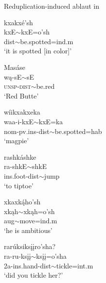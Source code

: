 \begin{exe}
\item\label{ablautredup} Reduplication-induced ablaut in \citet{hollow1970}

	\begin{xlist}

	\item\label{ablautredup1}
	\glll kxakxé'sh\\
	kxE$\sim$kxE=o'sh\\
	dist$\sim$\textnormal{be.spotted}=ind.m\\
	\glt `it is spotted [in color]' \citep[126]{hollow1970}

	\item\label{ablautredup2}
	\glll Masáse\\
	wą-sE$\sim$sE\\
	\textsc{unsp}-\textsc{dist}$\sim$\textnormal{be.red}\\
	\glt `Red Butte' \citep[29]{hollow1970}

	\item\label{ablautredup3}
	\glll wíikxakxeka\\
	waa-i-kxE$\sim$kxE=ka\\
	nom-pv.ins-dist$\sim$\textnormal{be.spotted}=hab\\
	\glt `magpie' \citep[289]{hollow1970}

	\item\label{ablautredup4}
	\glll rashkáshke\\
	ra-shkE$\sim$shkE\\
	ins.foot-dist$\sim$\textnormal{jump}\\
	\glt `to tiptoe' \citep[231]{hollow1970}

	\item\label{ablautredup5}
	\glll xkaxką́ho'sh\\
	xkąh$\sim$xkąh=o'sh\\
	aug$\sim$\textnormal{move}=ind.m\\
	\glt `he is ambitious' \citep[316]{hollow1970}

	\item\label{ablautredup6}
	\glll rarúksiksįįro'sha?\\
	ra-ru-ksįį$\sim$ksįį=o'sha\\
	2a-ins.hand-dist$\sim$\textnormal{tickle}=int.m\\
	\glt `did you tickle her?' \citep[476]{hollow1970}

	\end{xlist}

\end{exe}

